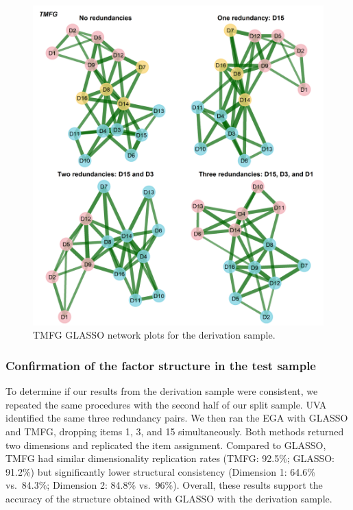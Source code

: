\documentclass[
  12pt,
  twoside,
  openright,
  a4paper,
  chapter=TITLE,
  section=TITLE,
  brazil]{abntex2}
\begin{document}
\begin{figure}

{\centering \includegraphics{img/tmfg-plots-1.png}

}

\caption{\label{fig-tmfg-plots}TMFG GLASSO network plots for the
derivation sample.}

\end{figure}

\hypertarget{confirmation-of-the-factor-structure-in-the-test-sample}{%
\subsubsection{Confirmation of the factor structure in the test
sample}\label{confirmation-of-the-factor-structure-in-the-test-sample}}

To determine if our results from the derivation sample were consistent,
we repeated the same procedures with the second half of our split
sample. UVA identified the same three redundancy pairs. We then ran the
EGA with GLASSO and TMFG, dropping items 1, 3, and 15 simultaneously.
Both methods returned two dimensions and replicated the item assignment.
Compared to GLASSO, TMFG had similar dimensionality replication rates
(TMFG: 92.5\%; GLASSO: 91.2\%) but significantly lower structural
consistency (Dimension 1: 64.6\% vs.~84.3\%; Dimension 2: 84.8\%
vs.~96\%). Overall, these results support the accuracy of the structure
obtained with GLASSO with the derivation sample.
\end{document}
